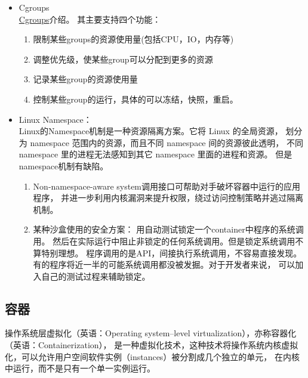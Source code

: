 \documentclass[AutoFakeBold,a4paper]{ctexart}
\begin{document}
\begin{enumerate}
\begin{itemize}
    \item Cgroups\\
    \href{https://en.wikipedia.org/wiki/Cgroups}{Cgroups}介绍。
    其主要支持四个功能：
    \begin{enumerate}
        \item 限制某些groups的资源使用量(包括CPU，IO，内存等)
        \item 调整优先级，使某些group可以分配到更多的资源
        \item 记录某些group的资源使用量
        \item 控制某些group的运行，具体的可以冻结，快照，重启。
    \end{enumerate}

    \item Linux Namespace：\\
    Linux的Namespace机制是一种资源隔离方案。它将 Linux 的全局资源，
    划分为 namespace 范围内的资源，而且不同 namespace 间的资源彼此透明，
    不同 namespace 里的进程无法感知到其它 namespace 里面的进程和资源。
    但是namespace机制有缺陷。
    \begin{enumerate}
        \item Non-namespace-aware system调用接口可帮助对手破坏容器中运行的应用程序，
        并进一步利用内核漏洞来提升权限，绕过访问控制策略并逃过隔离机制。\cite{2019Practical}
        \item 某种沙盒使用的安全方案\cite{2019Practical}：
        用自动测试锁定一个container中程序的系统调用。
        然后在实际运行中阻止非锁定的任何系统调用。但是锁定系统调用不算特别理想。
        程序调用的是API，间接执行系统调用，不容易直接发现。
        有的程序将近一半的可能系统调用都没被发掘。对于开发者来说，
        可以加入自己的测试过程来辅助锁定。
    \end{enumerate}

\end{itemize}

\end{enumerate}






\subsection{容器}
操作系统层虚拟化（英语：Operating system–level virtualization），亦称容器化（英语：Containerization），
是一种虚拟化技术，这种技术将操作系统内核虚拟化，可以允许用户空间软件实例（instances）被分割成几个独立的单元，
在内核中运行，而不是只有一个单一实例运行。
\end{document}

